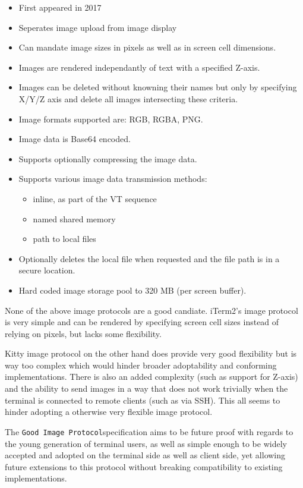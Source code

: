 \documentclass[a4paper]{article}
\newcommand{\code}[1]{\colorbox{light-gray}{\texttt{#1}}}
\newcommand{\GoodImageProtocol}{\code{Good Image Protocol}}
\begin{document}
\begin{itemize}
    \item First appeared in 2017
    \item Seperates image upload from image display
    \item Can mandate image sizes in pixels as well as in screen cell dimensions.
    \item Images are rendered independantly of text with a specified Z-axis.
    \item Images can be deleted without knowning their names but only by specifying X/Y/Z axis
          and delete all images intersecting these criteria.
    \item Image formats supported are: RGB, RGBA, PNG.
    \item Image data is Base64 encoded.
    \item Supports optionally compressing the image data.
    \item Supports various image data transmission methods:
        \begin{itemize}
            \item inline, as part of the VT sequence
            \item named shared memory
            \item path to local files
        \end{itemize}
    \item Optionally deletes the local file when requested and the file path is in a secure location.
    \item Hard coded image storage pool to 320 MB (per screen buffer).
\end{itemize}

None of the above image protocols are a good candiate. iTerm2's image protocol is very simple and
can be rendered by specifying screen cell sizes instead of relying on pixels, but lacks some
flexibility.

Kitty image protocol on the other hand does provide very good flexibility but is way too complex which
would hinder broader adoptability and conforming implementations. There is also an added complexity
(such as support for Z-axis) and the ability to send images in a way that does not work trivially
when the terminal is connected to remote clients (such as via SSH). This all seems to hinder
adopting a otherwise very flexible image protocol.

The \GoodImageProtocol specification aims to be future proof with regards to the young generation
of terminal users, as well as simple enough to be widely accepted and adopted on the terminal side
as well as client side, yet allowing future extensions to this protocol
without breaking compatibility to existing implementations.
\end{document}
